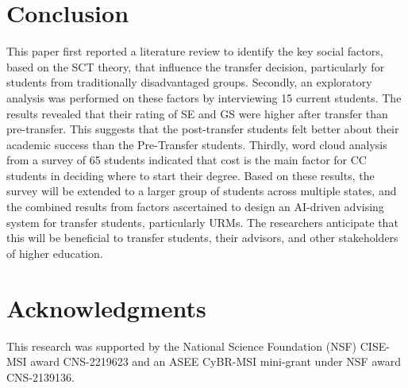 \documentclass{article}
\begin{document}
\section{Conclusion}
This paper first reported a literature review to identify the key social factors, based on the SCT theory, that influence the transfer decision, particularly for students from traditionally disadvantaged groups. Secondly, an exploratory analysis was performed on these factors by interviewing 15 current students. %
The results revealed that their rating of SE and GS were higher after transfer than pre-transfer. 
This suggests that the post-transfer students felt better about their academic success than the Pre-Transfer students.
Thirdly, word cloud analysis from a survey of 65 students indicated that cost is the main factor for CC students in deciding where to start their degree. %
 Based on these results, the survey will be extended to a larger group of students across multiple states, and the combined results from factors ascertained to design an AI-driven advising system for transfer students, particularly URMs. %
 The researchers anticipate that this %
 will be beneficial to transfer students, their advisors, and other stakeholders of higher education.
\section{Acknowledgments}
\small
This research was supported by the National Science Foundation (NSF) CISE-MSI award CNS-2219623 and an ASEE CyBR-MSI mini-grant under NSF award CNS-2139136. 

\printbibliography
\end{document}
